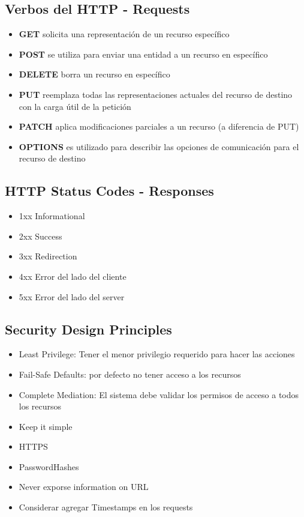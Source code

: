 \subsection*{Verbos del HTTP - Requests}

\begin{itemize}
\item \textbf{GET} solicita una representación de un recurso específico
\item \textbf{POST} se utiliza para enviar una entidad a un recurso en específico
\item \textbf{DELETE} borra un recurso en específico
\item \textbf{PUT} reemplaza todas las representaciones actuales del recurso de destino con la carga útil de la petición
\item \textbf{PATCH} aplica modificaciones parciales a un recurso (a diferencia de PUT)
\item \textbf{OPTIONS} es utilizado para describir las opciones de comunicación para el recurso de destino
\end{itemize}



\subsection*{HTTP Status Codes - Responses}

\begin{itemize}
\item 1xx Informational
\item 2xx Success
\item 3xx Redirection
\item 4xx Error del lado del cliente
\item 5xx Error del lado del server
\end{itemize}



\subsection*{Security Design Principles}

\begin{itemize}
\item Least Privilege: Tener el menor privilegio requerido para hacer las acciones
\item Fail-Safe Defaults: por defecto no tener acceso a los recursos
\item Complete Mediation: El sistema debe validar los permisos de acceso a todos los recursos
\item Keep it simple
\item HTTPS
\item PasswordHashes
\item Never exporse information on URL
\item Considerar agregar Timestamps en los requests
\end{itemize}



